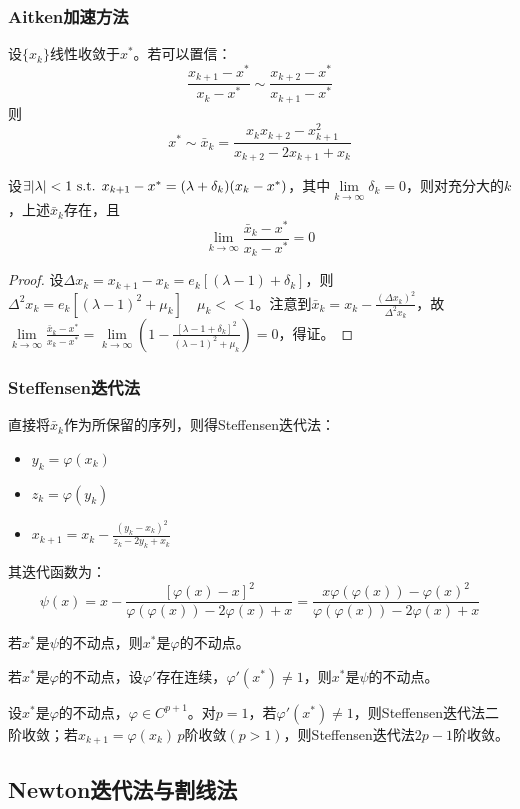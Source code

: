 \documentclass{ctexart}
\begin{document}
\subsubsection{Aitken加速方法}
设$\{x_k\}$线性收敛于$x^*$。若可以置信：
\[\frac{x_{k+1}-x^*}{x_k-x^*}\sim\frac{x_{k+2}-x^*}{x_{k+1}-x^*}\]
则
\[x^*\sim\bar x_k=\frac{x_kx_{k+2}-x_{k+1}^2}{x_{k+2}-2x_{k+1}+x_k}\]
\begin{Thm}
设$\exists|\lambda|<1\text{ s.t. } x_{k+1}-x^*=(\lambda+\delta_k)(x_k-x^*)$，其中$\lim\limits_{k\to\infty}\delta_k=0$，则对充分大的$k$，上述$\bar x_k$存在，且
\[\lim_{k\to\infty}\frac{\bar x_k-x^*}{x_k-x^*}=0\]
\end{Thm}
\begin{proof}
设$\Delta x_k=x_{k+1}-x_k=e_k[(\lambda-1)+\delta_k]$，则$\Delta^2 x_k=e_k[(\lambda-1)^2+\mu_k]\quad \mu_k<<1$。注意到$\bar x_k=x_k-\frac{(\Delta x_k)^2}{\Delta^2 x_k}$，故$\lim\limits_{k\to\infty}\frac{\bar x_k-x^*}{x_k-x^*}=\lim\limits_{k\to\infty}(1-\frac{[\lambda-1+\delta_k]^2}{(\lambda-1)^2+\mu_k})=0$，得证。
\end{proof}

\subsubsection{Steffensen迭代法}
直接将$\bar x_k$作为所保留的序列，则得Steffensen迭代法：
\begin{itemize}
\item $y_k=\varphi(x_k)$
\item $z_k=\varphi(y_k)$
\item $x_{k+1}=x_k-\frac{(y_k-x_k)^2}{z_k-2y_k+x_k}$
\end{itemize}
其迭代函数为：
\[\psi(x)=x-\frac{[\varphi(x)-x]^2}{\varphi(\varphi(x))-2\varphi(x)+x}=\frac{x\varphi(\varphi(x))-\varphi(x)^2}{\varphi(\varphi(x))-2\varphi(x)+x}\]

\begin{Thm}
若$x^*$是$\psi$的不动点，则$x^*$是$\varphi$的不动点。

若$x^*$是$\varphi$的不动点，设$\varphi'$存在连续，$\varphi'(x^*)\neq 1$，则$x^*$是$\psi$的不动点。
\end{Thm}

\begin{Thm}
设$x^*$是$\varphi$的不动点，$\varphi\in C^{p+1}$。对$p=1$，若$\varphi'(x^*)\neq 1$，则Steffensen迭代法二阶收敛；若$x_{k+1}=\varphi(x_k)\, p$阶收敛$(p>1)$，则Steffensen迭代法$2p-1$阶收敛。
\end{Thm}

\subsection{Newton迭代法与割线法}
\end{document}
